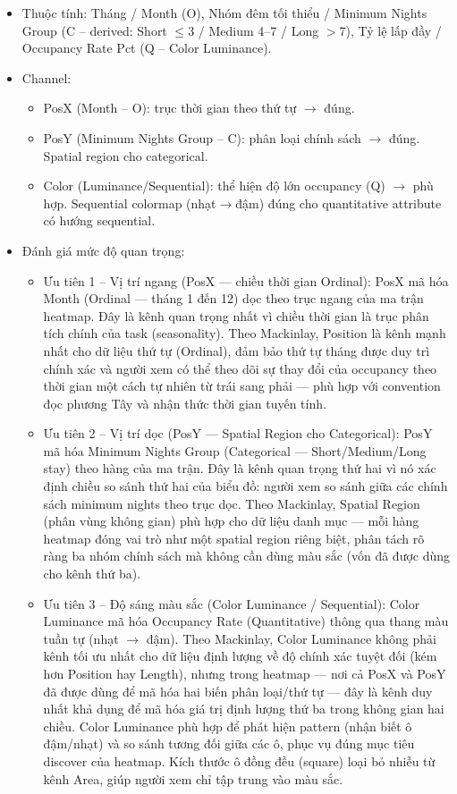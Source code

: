 \begin{itemize}
    \item Thuộc tính: Tháng / Month (O), Nhóm đêm tối thiểu / Minimum Nights Group (C -- derived: Short $\leq$3 / Medium 4--7 / Long $>$7), Tỷ lệ lấp đầy / Occupancy Rate Pct (Q -- Color Luminance).
    \item Channel:
    \begin{itemize}
        \item PosX (Month -- O): trục thời gian theo thứ tự $\rightarrow$ đúng.
        \item PosY (Minimum Nights Group -- C): phân loại chính sách $\rightarrow$ đúng. Spatial region cho categorical.
        \item Color (Luminance/Sequential): thể hiện độ lớn occupancy (Q) $\rightarrow$ phù hợp. Sequential colormap (nhạt$\rightarrow$đậm) đúng cho quantitative attribute có hướng sequential.
    \end{itemize}
    \item Đánh giá mức độ quan trọng:
    \begin{itemize}
        \item Ưu tiên 1 -- Vị trí ngang (PosX --- chiều thời gian Ordinal): PosX mã hóa Month (Ordinal --- tháng 1 đến 12) dọc theo trục ngang của ma trận heatmap. Đây là kênh quan trọng nhất vì chiều thời gian là trục phân tích chính của task (seasonality). Theo Mackinlay, Position là kênh mạnh nhất cho dữ liệu thứ tự (Ordinal), đảm bảo thứ tự tháng được duy trì chính xác và người xem có thể theo dõi sự thay đổi của occupancy theo thời gian một cách tự nhiên từ trái sang phải --- phù hợp với convention đọc phương Tây và nhận thức thời gian tuyến tính.
        \item Ưu tiên 2 -- Vị trí dọc (PosY --- Spatial Region cho Categorical): PosY mã hóa Minimum Nights Group (Categorical --- Short/Medium/Long stay) theo hàng của ma trận. Đây là kênh quan trọng thứ hai vì nó xác định chiều so sánh thứ hai của biểu đồ: người xem so sánh giữa các chính sách minimum nights theo trục dọc. Theo Mackinlay, Spatial Region (phân vùng không gian) phù hợp cho dữ liệu danh mục --- mỗi hàng heatmap đóng vai trò như một spatial region riêng biệt, phân tách rõ ràng ba nhóm chính sách mà không cần dùng màu sắc (vốn đã được dùng cho kênh thứ ba).
        \item Ưu tiên 3 -- Độ sáng màu sắc (Color Luminance / Sequential): Color Luminance mã hóa Occupancy Rate (Quantitative) thông qua thang màu tuần tự (nhạt $\rightarrow$ đậm). Theo Mackinlay, Color Luminance không phải kênh tối ưu nhất cho dữ liệu định lượng về độ chính xác tuyệt đối (kém hơn Position hay Length), nhưng trong heatmap --- nơi cả PosX và PosY đã được dùng để mã hóa hai biến phân loại/thứ tự --- đây là kênh duy nhất khả dụng để mã hóa giá trị định lượng thứ ba trong không gian hai chiều. Color Luminance phù hợp để phát hiện pattern (nhận biết ô đậm/nhạt) và so sánh tương đối giữa các ô, phục vụ đúng mục tiêu discover của heatmap. Kích thước ô đồng đều (square) loại bỏ nhiễu từ kênh Area, giúp người xem chỉ tập trung vào màu sắc.

\end{itemize}
\end{itemize}
